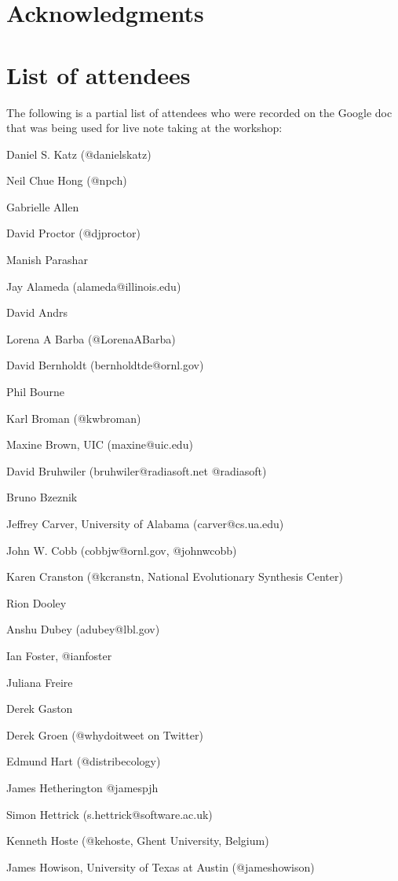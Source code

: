 \documentclass[11pt, oneside]{amsart}
\begin{document}
\section*{Acknowledgments}

\appendix
\section{List of attendees}

The following is a partial list of attendees who were recorded on the Google doc that was being used for live note taking at the workshop:

Daniel S. Katz (@danielskatz)

Neil Chue Hong (@npch)

Gabrielle Allen

David Proctor (@djproctor)

Manish Parashar

Jay Alameda (alameda@illinois.edu)

David Andrs

Lorena A Barba (@LorenaABarba)

David Bernholdt (bernholdtde@ornl.gov)

Phil Bourne

Karl Broman (@kwbroman)

Maxine Brown, UIC (maxine@uic.edu)

David Bruhwiler   (bruhwiler@radiasoft.net    @radiasoft)

Bruno Bzeznik

Jeffrey Carver, University of Alabama (carver@cs.ua.edu)

John W. Cobb (cobbjw@ornl.gov, @johnwcobb)

Karen Cranston (@kcranstn, National Evolutionary Synthesis Center)

Rion Dooley

Anshu Dubey (adubey@lbl.gov)

Ian Foster, @ianfoster

Juliana Freire

Derek Gaston

Derek Groen (@whydoitweet on Twitter)

Edmund Hart (@distribecology)

James Hetherington @jamespjh

Simon Hettrick (s.hettrick@software.ac.uk)

Kenneth Hoste (@kehoste, Ghent University, Belgium)

James Howison, University of Texas at Austin (@jameshowison)
\end{document}
